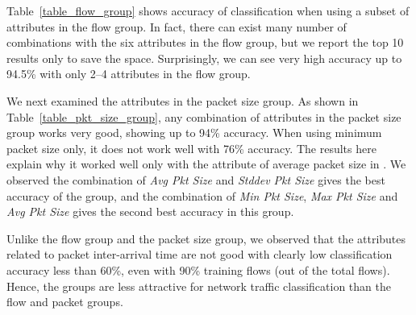 \documentclass[conference]{IEEEtran}
\begin{document}
Table~\ref{table_flow_group} shows accuracy of classification when using a subset of attributes in the flow group.
In fact, there can exist many number of combinations with the six attributes in the flow group, but we report the top 10 results only to save the space.
Surprisingly, we can see very high accuracy up to 94.5\% with only 2--4 attributes in the flow group.

We next examined the attributes in the packet size group.
As shown in Table~\ref{table_pkt_size_group}, any combination of attributes in the packet size group works very good, showing up to 94\% accuracy.
When using minimum packet size only, it does not work well with 76\% accuracy.
The results here explain why it worked well only with the attribute of average packet size in \cite{Bernaille:2006:EAI:1368436.1368445}.
We observed the combination of \emph{Avg Pkt Size} and \emph{Stddev Pkt Size} gives the best accuracy of the group, and the combination of \emph{Min Pkt Size}, \emph{Max Pkt Size} and \emph{Avg Pkt Size} gives the second best accuracy in this group.

Unlike the flow group and the packet size group, we observed that the attributes related to packet inter-arrival time are not good with clearly low classification accuracy less than 60\%, even with 90\% training flows (out of the total flows).
Hence, the groups are less attractive for network traffic classification than the flow and packet groups.

\end{document}
